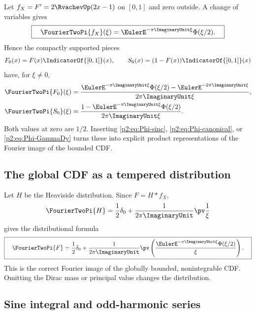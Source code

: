 \documentclass[11pt]{article}
\theoremstyle{definition}
\theoremstyle{remark}
\begin{document}
Let $f_X=F'=2\RvachevUp(2x-1)$ on $[0,1]$ and zero outside.  A change of variables gives
\begin{equation}
 \boxed{\quad
 \FourierTwoPi{f_X}(\xi)=\EulerE^{-\pi\ImaginaryUnit\xi}\Phi(\xi/2).
 \quad}                                                  \label{p2:eq:fX-transform}
\end{equation}
Hence the compactly supported pieces
\begin{equation}
 F_0(x)=F(x)\IndicatorOf{[0,1]}(x),
 \qquad
 S_0(x)=(1-F(x))\IndicatorOf{[0,1]}(x)                      \label{p2:eq:F0S0}
\end{equation}
have, for $\xi\ne0$,
\begin{align}
 \FourierTwoPi{F_0}(\xi)
 &=\frac{\EulerE^{-\pi\ImaginaryUnit\xi}\Phi(\xi/2)-\EulerE^{-2\pi\ImaginaryUnit\xi}}
 {2\pi\ImaginaryUnit\xi},                                         \label{p2:eq:F0-transform}\\
 \FourierTwoPi{S_0}(\xi)
 &=\frac{1-\EulerE^{-\pi\ImaginaryUnit\xi}\Phi(\xi/2)}{2\pi\ImaginaryUnit\xi}.\label{p2:eq:S0-transform}
\end{align}
Both values at zero are $1/2$.  Inserting \eqref{p2:eq:Phi-sinc},
\eqref{p2:eq:Phi-canonical}, or \eqref{p2:eq:Phi-GammaDy} turns these into explicit product
representations of the Fourier image of the bounded CDF.

\subsection{The global CDF as a tempered distribution}

Let $H$ be the Heaviside distribution.  Since $F=H\ast f_X$,
\begin{equation}
 \FourierTwoPi{H}=\frac12\delta_0+\frac{1}{2\pi\ImaginaryUnit}\pv\frac1\xi
\end{equation}
gives the distributional formula
\begin{equation}
 \boxed{\quad
 \FourierTwoPi{F}
 =\frac12\delta_0+
 \frac{1}{2\pi\ImaginaryUnit}\pv\left(
 \frac{\EulerE^{-\pi\ImaginaryUnit\xi}\Phi(\xi/2)}{\xi}
 \right).
 \quad}                                                  \label{p2:eq:F-distribution-transform}
\end{equation}
This is the correct Fourier image of the globally bounded, nonintegrable CDF.  Omitting the
Dirac mass or principal value changes the distribution.

\subsection{Sine integral and odd-harmonic series}
\end{document}
